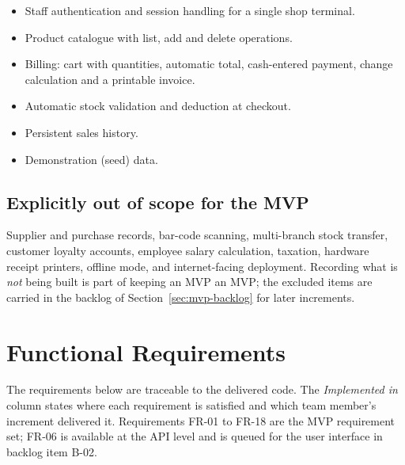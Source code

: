 \documentclass[11pt,a4paper]{article}
\begin{document}
\begin{itemize}
  \item Staff authentication and session handling for a single shop terminal.
  \item Product catalogue with list, add and delete operations.
  \item Billing: cart with quantities, automatic total, cash-entered payment, change
        calculation and a printable invoice.
  \item Automatic stock validation and deduction at checkout.
  \item Persistent sales history.
  \item Demonstration (seed) data.
\end{itemize}

\subsection{Explicitly out of scope for the MVP}

Supplier and purchase records, bar-code scanning, multi-branch stock transfer, customer
loyalty accounts, employee salary calculation, taxation, hardware receipt printers, offline
mode, and internet-facing deployment. Recording what is \emph{not} being built is part of
keeping an MVP an MVP; the excluded items are carried in the backlog of
Section~\ref{sec:mvp-backlog} for later increments.

\section{Functional Requirements}
\label{sec:fr}

The requirements below are traceable to the delivered code. The \emph{Implemented in}
column states where each requirement is satisfied and which team member's increment
delivered it. Requirements FR-01 to FR-18 are the MVP requirement set; FR-06 is available at
the API level and is queued for the user interface in backlog item B-02.
\end{document}
